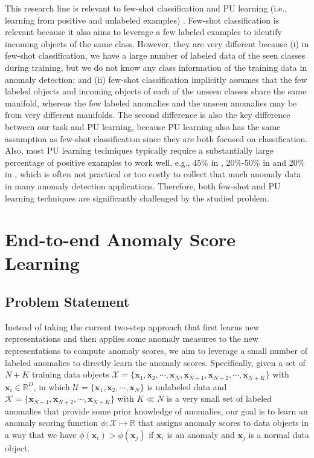 \documentclass[sigconf]{acmart}
\begin{document}
This research line is relevant to few-shot classification \cite{fei2006oneshot,snell2017protonet} and PU learning (i.e., learning from positive and unlabeled examples) \cite{li2003pul,elkan2008pul,sansone2018pul}. Few-shot classification is relevant because it also aims to leverage a few labeled examples to identify incoming objects of the same class. However, they are very different because (i) in few-shot classification, we have a large number of labeled data of the seen classes during training, but we do not know any class information of the training data in anomaly detection; and (ii) few-shot classification implicitly assumes that the few labeled objects and incoming objects of each of the unseen classes share the same manifold, whereas the few labeled anomalies and the unseen anomalies may be from very different manifolds. The second difference is also the key difference between our task and PU learning, because PU learning also has the same assumption as few-shot classification since they are both focused on classification. Also, most PU learning techniques typically require a substantially large percentage of positive examples to work well, e.g., 45\% in \cite{li2003pul}, 20\%-50\% in \cite{elkan2008pul} and 20\% in \cite{sansone2018pul}, which is often not practical or too costly to collect that much anomaly data in many anomaly detection applications. Therefore, both few-shot and PU learning techniques are significantly challenged by the studied problem.







\section{End-to-end Anomaly Score Learning}

\subsection{Problem Statement}

Instead of taking the current two-step approach that first learns new representations and then applies some anomaly measures to the new representations to compute anomaly scores, we aim to leverage a small number of labeled anomalies to directly learn the anomaly scores. Specifically, given a set of $N+K$ training data objects $\mathcal{X}=\{ \mathbf{x}_{1}, \mathbf{x}_{2}, \cdots, \mathbf{x}_{N}, \mathbf{x}_{N+1}, \mathbf{x}_{N+2}, \cdots, \mathbf{x}_{N+K} \}$ with $\mathbf{x}_{i} \in \mathbb{R}^{D}$, in which $\mathcal{U}=\{ \mathbf{x}_{1}, \mathbf{x}_{2}, \cdots, \mathbf{x}_{N}\}$ is unlabeled data and $\mathcal{K}=\{\mathbf{x}_{N+1}, \mathbf{x}_{N+2}, \cdots, \mathbf{x}_{N+K} \}$ with $K\ll N$ is a very small set of labeled anomalies that provide some prior knowledge of anomalies, our goal is to learn an anomaly scoring function $\phi: \mathcal{X} \mapsto \mathbb{R}$ that assigns anomaly scores to data objects in a way that we have $\phi(\mathbf{x}_{i}) > \phi(\mathbf{x}_{j})$ if $\mathbf{x}_{i}$ is an anomaly and $\mathbf{x}_{j}$ is a normal data object. 
\end{document}
